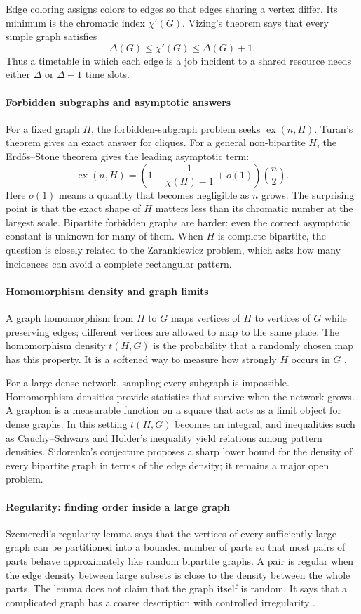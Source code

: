 Edge coloring assigns colors to edges so that edges sharing a vertex differ. Its minimum is the chromatic index $\chi'(G)$. Vizing's theorem says that every simple graph satisfies
\[
\Delta(G)\leq\chi'(G)\leq\Delta(G)+1.
\]
Thus a timetable in which each edge is a job incident to a shared resource needs either $\Delta$ or $\Delta+1$ time slots.

\paragraph{Forbidden subgraphs and asymptotic answers}
For a fixed graph $H$, the forbidden-subgraph problem seeks $\operatorname{ex}(n,H)$. Turan's theorem gives an exact answer for cliques. For a general non-bipartite $H$, the Erdős--Stone theorem gives the leading asymptotic term:
\[
\operatorname{ex}(n,H)=\left(1-\frac{1}{\chi(H)-1}+o(1)\right)\binom n2.
\]
Here $o(1)$ means a quantity that becomes negligible as $n$ grows. The surprising point is that the exact shape of $H$ matters less than its chromatic number at the largest scale. Bipartite forbidden graphs are harder: even the correct asymptotic constant is unknown for many of them. When $H$ is complete bipartite, the question is closely related to the Zarankiewicz problem, which asks how many incidences can avoid a complete rectangular pattern.

\paragraph{Homomorphism density and graph limits}
A graph homomorphism from $H$ to $G$ maps vertices of $H$ to vertices of $G$ while preserving edges; different vertices are allowed to map to the same place. The homomorphism density $t(H,G)$ is the probability that a randomly chosen map has this property. It is a softened way to measure how strongly $H$ occurs in $G$ \cite{extremal_graph_theory_ref1}.

For a large dense network, sampling every subgraph is impossible. Homomorphism densities provide statistics that survive when the network grows. A graphon is a measurable function on a square that acts as a limit object for dense graphs. In this setting $t(H,G)$ becomes an integral, and inequalities such as Cauchy--Schwarz and Holder's inequality yield relations among pattern densities. Sidorenko's conjecture proposes a sharp lower bound for the density of every bipartite graph in terms of the edge density; it remains a major open problem.

\paragraph{Regularity: finding order inside a large graph}
Szemeredi's regularity lemma says that the vertices of every sufficiently large graph can be partitioned into a bounded number of parts so that most pairs of parts behave approximately like random bipartite graphs. A pair is regular when the edge density between large subsets is close to the density between the whole parts. The lemma does not claim that the graph itself is random. It says that a complicated graph has a coarse description with controlled irregularity \cite{extremal_graph_theory_ref4,extremal_graph_theory_ref6}.

